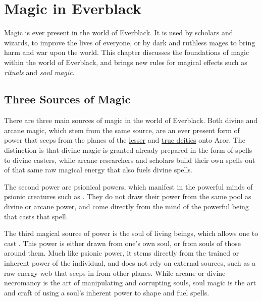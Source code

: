 \chapter{Magic in Everblack}
\label{sec:Magic}

Magic is ever present in the world of Everblack. It is used by scholars and
wizards, to improve the lives of everyone, or by dark and ruthless mages to
bring harm and war upon the world. This chapter discusses the foundations of
magic within the world of Everblack, and brings new rules for magical effects
such as \emph{rituals} and \emph{soul magic}.

\section{Three Sources of Magic}

There are three main sources of magic in the world of Everblack. Both divine
and arcane magic, which stem from the same source, are an ever present form of
power that seeps from the planes of the \hyperref[sec:Lesser Deities]{lesser}
and \hyperref[sec:True Deities]{true deities} onto Aror. The distinction is
that divine magic is granted already prepared in the form of spells to divine
casters, while arcane researchers and scholars build their own spells out of
that same raw magical energy that also fuels divine spells.

The second power are psionical powers, which manifest in the powerful minds of
psionic creatures such as . They do not draw their power
from the same pool as divine or arcane power, and come directly from the mind
of the powerful being that casts that spell.

The third magical source of power is the soul of living beings, which allows
one to cast . This power is either drawn from one's
own soul, or from souls of those around them. Much like psionic power, it
stems directly from the trained or inherent power of the individual, and does
not rely on external sources, such as a raw energy web that seeps in from
other planes. While arcane or divine necromancy is the art of manipulating
and corrupting souls, soul magic is the art and craft of using a soul's
inherent power to shape and fuel spells.






